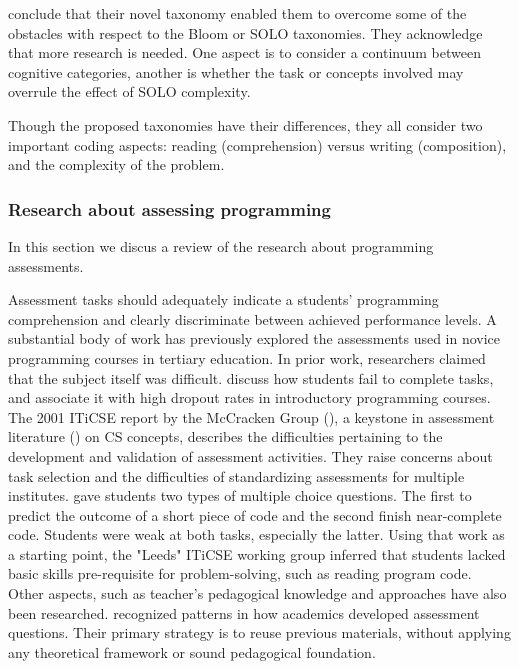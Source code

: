 conclude that their novel taxonomy enabled them to overcome some of the obstacles with respect to the Bloom or SOLO taxonomies. They acknowledge that more research is needed. One aspect is to consider a continuum between cognitive categories, another is whether the task or concepts involved may overrule the effect of SOLO complexity.



Though the proposed taxonomies have their differences, they all consider two important coding aspects: reading (comprehension) versus writing (composition), and the complexity of the problem.




\subsubsection{Research about assessing programming}\label{sec:researchAssProgramming}
In this section we discus a review of the research about programming assessments.

Assessment tasks should adequately indicate a students’ programming comprehension and clearly discriminate between achieved performance levels.
A substantial body of work has previously explored the assessments used in novice programming courses in tertiary education. In prior work, researchers claimed that the subject itself was difficult.  discuss how students fail to complete tasks, and  associate it with high dropout rates in introductory programming courses. The 2001 ITiCSE report by the McCracken Group (\cite{McCracken2001}), a keystone in assessment literature (\cite{Giordano2015}) on CS concepts, describes the difficulties pertaining to the development and validation of assessment activities. They raise concerns about task selection and the difficulties of standardizing assessments for multiple institutes.   gave students two types of multiple choice questions. The first to predict the outcome of a short piece of code and the second finish near-complete code. Students were weak at both tasks, especially the latter. Using that work as a starting point, the "Leeds" ITiCSE working group inferred that students lacked basic skills pre-requisite for problem-solving, such as reading program code. Other aspects, such as teacher's pedagogical knowledge and approaches have also been researched.  recognized patterns in how academics developed assessment questions. Their primary strategy is to reuse previous materials, without applying any theoretical framework or sound pedagogical foundation.


